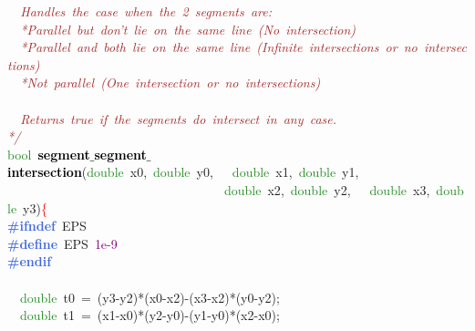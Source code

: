 {{\mbox{}\textit{\textcolor{Brown}{\ \ Handles\ the\ case\ when\ the\ 2\ segments\ are:}} \\
\mbox{}\textit{\textcolor{Brown}{\ \ *Parallel\ but\ don't\ lie\ on\ the\ same\ line\ (No\ intersection)}} \\
\mbox{}\textit{\textcolor{Brown}{\ \ *Parallel\ and\ both\ lie\ on\ the\ same\ line\ (Infinite\ intersections\ or\ no\ intersections)}} \\
\mbox{}\textit{\textcolor{Brown}{\ \ *Not\ parallel\ (One\ intersection\ or\ no\ intersections)}} \\
\mbox{} \\
\mbox{}\textit{\textcolor{Brown}{\ \ Returns\ true\ if\ the\ segments\ do\ intersect\ in\ any\ case.}} \\
\mbox{}\textit{\textcolor{Brown}{*/}} \\
\mbox{}\textcolor{ForestGreen}{bool}\ \textbf{\textcolor{Black}{segment$\_$segment$\_$intersection}}\textcolor{BrickRed}{(}\textcolor{ForestGreen}{double}\ x0\textcolor{BrickRed}{,}\ \textcolor{ForestGreen}{double}\ y0\textcolor{BrickRed}{,}\ \ \ \textcolor{ForestGreen}{double}\ x1\textcolor{BrickRed}{,}\ \textcolor{ForestGreen}{double}\ y1\textcolor{BrickRed}{,} \\
\mbox{}\ \ \ \ \ \ \ \ \ \ \ \ \ \ \ \ \ \ \ \ \ \ \ \ \ \ \ \ \ \ \ \ \ \ \textcolor{ForestGreen}{double}\ x2\textcolor{BrickRed}{,}\ \textcolor{ForestGreen}{double}\ y2\textcolor{BrickRed}{,}\ \ \ \textcolor{ForestGreen}{double}\ x3\textcolor{BrickRed}{,}\ \textcolor{ForestGreen}{double}\ y3\textcolor{BrickRed}{)}\textcolor{Red}{\{} \\
\mbox{}\textbf{\textcolor{RoyalBlue}{\#ifndef}}\ EPS \\
\mbox{}\textbf{\textcolor{RoyalBlue}{\#define}}\ EPS\ \textcolor{Purple}{1e-9} \\
\mbox{}\textbf{\textcolor{RoyalBlue}{\#endif}} \\
\mbox{} \\
\mbox{}\ \ \textcolor{ForestGreen}{double}\ t0\ \textcolor{BrickRed}{=}\ \textcolor{BrickRed}{(}y3\textcolor{BrickRed}{-}y2\textcolor{BrickRed}{)*(}x0\textcolor{BrickRed}{-}x2\textcolor{BrickRed}{)-(}x3\textcolor{BrickRed}{-}x2\textcolor{BrickRed}{)*(}y0\textcolor{BrickRed}{-}y2\textcolor{BrickRed}{);} \\
\mbox{}\ \ \textcolor{ForestGreen}{double}\ t1\ \textcolor{BrickRed}{=}\ \textcolor{BrickRed}{(}x1\textcolor{BrickRed}{-}x0\textcolor{BrickRed}{)*(}y2\textcolor{BrickRed}{-}y0\textcolor{BrickRed}{)-(}y1\textcolor{BrickRed}{-}y0\textcolor{BrickRed}{)*(}x2\textcolor{BrickRed}{-}x0\textcolor{BrickRed}{);} \\
}}
